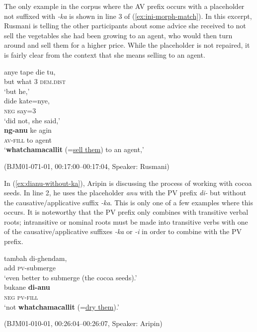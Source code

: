\documentclass[output=paper,
\ChapterDOI{10.5281/zenodo.15697583}
colorlinks,
citecolor=brown]{langscibook}
\begin{document}
The only example in the corpus where the AV prefix occurs with a placeholder not suffixed with \textit{-ka} is shown in line 3 of (\ref{ex:ini-morph-match}). In this excerpt, Rusmani is telling the other participants about some advice she received to not sell the vegetables she had been growing to an agent, who would then turn around and sell them for a higher price. While the placeholder is not repaired, it is fairly clear from the context that she means selling to an agent.

\begin{exe}
\ex\label{ex:ini-morph-match}
\begin{xlist}[0\quad →A:]
\gll anye tape die tu,\\
but what 3 \textsc{dem.dist}\\
\glt `but he,' \\
\exi{2\quad \hphantom{→R:}} 
\gll dide kate=nye,\\
\textsc{neg} say=3\\
\glt `did not, she said,' \\
\gll \textbf{ng-anu} ke agin\\
\textsc{av-fill} to agent\\
\glt `\textbf{whatchamacallit} (=\uline{sell them}) to an agent,' \\
\end{xlist}
\hfill (BJM01-071-01, 00:17:00--00:17:04, Speaker: Rusmani)
\end{exe}

In (\ref{ex:dianu-without-ka}), Aripin is discussing the process of working with cocoa seeds. In line 2, he uses the placeholder \textit{anu} with the PV prefix \textit{di-} but without the causative/applicative suffix \textit{-ka}. This is only one of a few examples where this occurs. It is noteworthy that the PV prefix only combines with transitive verbal roots; intransitive or nominal roots must be made into transitive verbs with one of the causative/applicative suffixes \textit{-ka} or \textit{-i} in order to combine with the PV prefix. 

\begin{exe}
\ex\label{ex:dianu-without-ka}
\begin{xlist}[0\quad →A:]
\gll tambah di-ghendam,\\
add \textsc{pv}-submerge\\
\glt `even better to submerge (the cocoa seeds).' \\
\gll bukane \textbf{di-anu}\\
\textsc{neg} \textsc{pv-fill}\\
\glt `not \textbf{whatchamacallit} (=\uline{dry them}).' \\
\end{xlist}
\hfill (BJM01-010-01, 00:26:04--00:26:07, Speaker: Aripin)
\end{exe}
\end{document}
